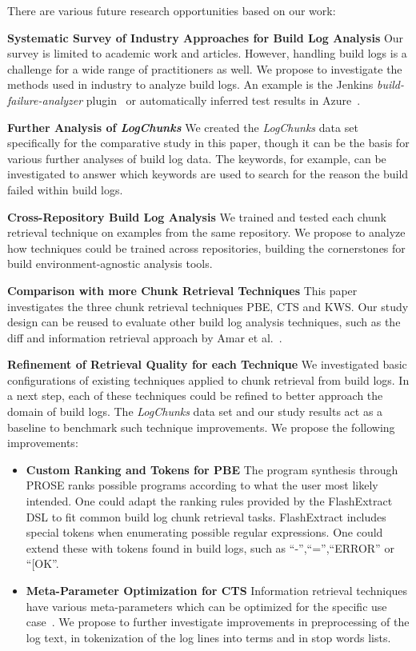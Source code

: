 There are various future research opportunities based on our work:

\textbf{Systematic Survey of Industry Approaches for Build
Log Analysis}
Our survey is limited to academic work and articles.
However, handling build logs is a challenge for a wide range of
practitioners as well.
We propose to investigate the methods used in industry to analyze
build logs.
An example is the Jenkins \emph{build-failure-analyzer}
plugin~\cite{jenkins2020failure-analyzer} or automatically
inferred test results in Azure~\cite{azure2020inferred}.

\textbf{Further Analysis of \emph{LogChunks}}
We created the
\emph{LogChunks} data set \cite{brandt2020logchunks} specifically for
the comparative
study in this paper, though it can be the basis for various further
analyses of build log data.
The keywords, for example, can be
investigated to answer which keywords are used to search for the
reason the build failed within build logs.

\textbf{Cross-Repository Build Log Analysis}
We trained and
tested each chunk retrieval technique on examples from the same
repository.
We propose to analyze how techniques could be trained
across repositories, building the cornerstones for build
environment-agnostic analysis tools.

\textbf{Comparison with more Chunk Retrieval Techniques}
This
paper investigates the three chunk retrieval techniques PBE, CTS and
KWS\@.
Our study design can be reused to evaluate other build log
analysis techniques, such as the diff and information retrieval
approach by Amar et al.~\cite{amar2019mining}.

\textbf{Refinement of Retrieval Quality for each Technique} We
investigated basic configurations of existing techniques applied to
chunk retrieval from build logs.
In a next step, each of these
techniques could be refined to better approach the domain of build
logs.
The \emph{LogChunks} data set and our study results act as a
baseline to benchmark such technique improvements.
We propose the
following improvements:
\begin{itemize}[leftmargin=0.4cm]
  \item \textbf{Custom Ranking and Tokens for PBE} The program
  synthesis through PROSE ranks possible programs according to
  what the user most likely intended.
  One could adapt the ranking
  rules provided by the FlashExtract DSL to fit common build log
  chunk retrieval tasks.
  FlashExtract includes special tokens when
  enumerating possible regular expressions.
  One could extend these
  with tokens found in build logs, such as ``-'',``='',``ERROR''
  or ``[OK''.
  \item \textbf{Meta-Parameter Optimization for CTS} Information
  retrieval techniques have various meta-parameters which can be
  optimized for the specific use
  case~\cite{panichella2016parameterizing}.
  We propose to further
  investigate improvements in preprocessing of the log text, in
  tokenization of the log lines into terms and in stop words
  lists.
\end{itemize}

